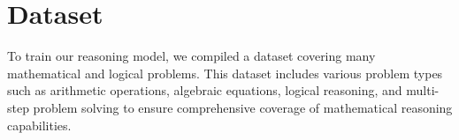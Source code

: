 \section{Dataset}
To train our reasoning model, we compiled a dataset covering many mathematical and logical problems. This dataset includes various problem types such as arithmetic operations, algebraic equations, logical reasoning, and multi-step problem solving to ensure comprehensive coverage of mathematical reasoning capabilities.